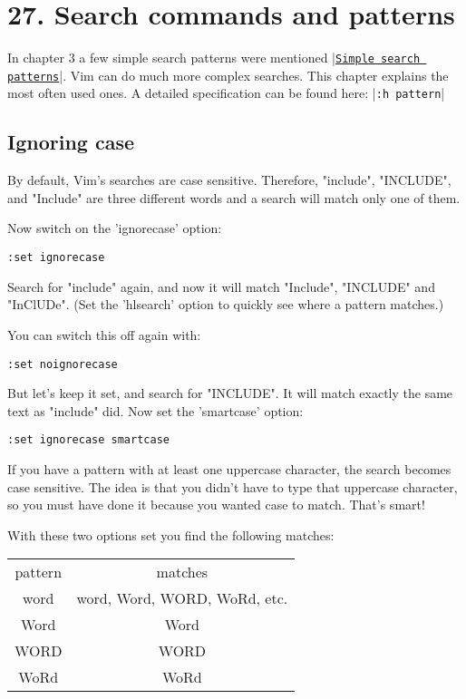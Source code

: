 \section{27. Search commands and patterns}
\label{Search commands and patterns}
In chapter 3 a few simple search patterns were mentioned |\hyperref[Simple search patterns]{\texttt{Simple search patterns}}|.
Vim can do much more complex searches.
This chapter explains the most often used ones.
A detailed specification can be found here: |\verb!:h pattern!|
\subsection{Ignoring case}
By default, Vim's searches are case sensitive.
Therefore, "include", "INCLUDE", and "Include" are three different words and a search will match only one of them.

Now switch on the 'ignorecase' option:

\begin{Verbatim}[samepage=true]
 :set ignorecase
\end{Verbatim}

Search for "include" again, and now it will match "Include", "INCLUDE" and "InClUDe".
(Set the 'hlsearch' option to quickly see where a pattern matches.)

You can switch this off again with:

\begin{Verbatim}[samepage=true]
 :set noignorecase
\end{Verbatim}

But let's keep it set, and search for "INCLUDE".
It will match exactly the same text as "include" did.
Now set the 'smartcase' option:

\begin{Verbatim}[samepage=true]
 :set ignorecase smartcase
\end{Verbatim}

If you have a pattern with at least one uppercase character, the search becomes case sensitive.
The idea is that you didn't have to type that uppercase character, so you must have done it because you wanted case to match.
That's smart!

With these two options set you find the following matches:

\begin{center} \begin{tabular}{c c}
				pattern & matches \\
				word & word, Word, WORD, WoRd, etc.\\
				Word & Word\\
				WORD & WORD\\
				WoRd & WoRd\\
\end{tabular} \end{center}


